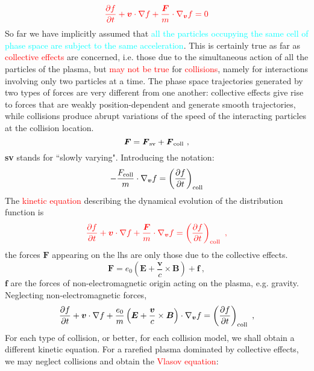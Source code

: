 \documentclass[12pt,a4paper]{article}
\renewcommand{\vec}[1]{\boldsymbol{#1}}
\begin{document}
\begin{equation}
\color{red} \frac{\partial f}{\partial t} +\vec{v} \cdot\nabla f +\frac{\vec{F}}{m} \cdot \nabla_{\vec{v}} f = 0
\end{equation}
So far we have implicitly assumed that \textcolor{cyan}{all the particles occupying the same cell of phase space are subject to the same acceleration}. This is certainly true as far as \textcolor{red}{collective effects} are concerned, i.e. those due to the simultaneous action of all the particles of the plasma, but \textcolor{red}{may not be true} for \textcolor{red}{collisions}, namely for interactions involving only two particles at a time. The phase space trajectories generated by two types of forces are very different from one another: collective effects give rise to forces that are weakly position-dependent and generate smooth trajectories, while collisions produce abrupt variations of the speed of the interacting particles at the collision location. 
\begin{equation*}
\vec{F} = \vec{F}_{\rm sv} + \vec{F}_{\rm coll} ~,
\end{equation*}
\textbf{sv} stands for ``slowly varying". Introducing the notation:
\begin{equation*}
-\frac{F_{\rm coll}}{m} \cdot \nabla_{\vec{v}} f = \left(\frac{\partial f}{\partial t} \right)_{\rm coll}
\end{equation*}
The \textcolor{red}{kinetic equation} describing the dynamical evolution of the distribution function is
\begin{equation}
\color{red} \frac{\partial f}{\partial t} +\vec{v} \cdot\nabla f +\frac{\vec{F}}{m} \cdot \nabla_{\vec{v}} f = \left(\frac{\partial f}{\partial t} \right)_{\rm coll} ~,
\end{equation}
the forces $\vec{F}$ appearing on the lhs are only those due to the collective effects.
\begin{equation*}
\vec{F} = e_0 \left(\vec{E} +\frac{\vec{v}}{c} \times \vec{B}\right) +\vec{f} ~,
\end{equation*}
$\vec{f}$ are the forces of non-electromagnetic origin acting on the plasma, e.g. gravity. Neglecting non-electromagnetic forces,
\begin{equation}
\frac{\partial f}{\partial t} +\vec{v} \cdot\nabla f +\frac{e_0}{m} \left(\vec{E} +\frac{\vec{v}}{c} \times \vec{B}\right) \cdot \nabla_{\vec{v}} f = \left(\frac{\partial f}{\partial t} \right)_{\rm coll} ~,
\end{equation}
For each type of collision, or better, for each collision model, we shall obtain a different kinetic equation. For a rarefied plasma dominated by collective effects, we may neglect collisions and obtain the \textcolor{red}{Vlasov equation}:
\end{document}
